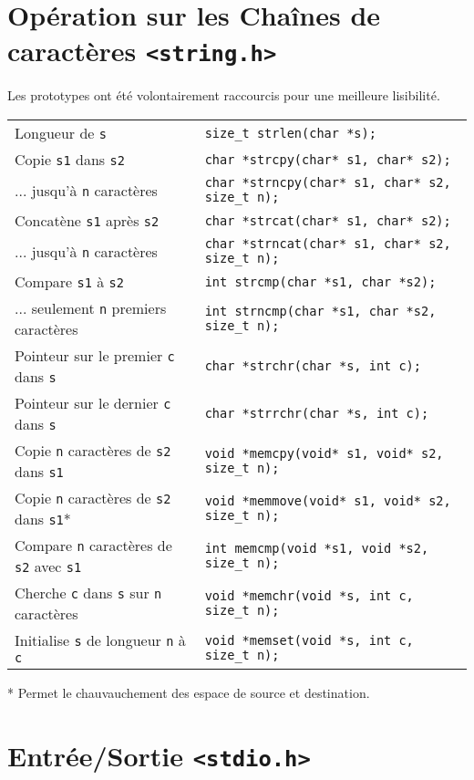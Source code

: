 \documentclass{article}
\newcommand{\cd}{\lstinline}
\begin{document}
\begin{multicols*}{3}
\section*{Opération sur les Chaînes de caractères \texttt{<string.h>}}
Les prototypes ont été volontairement raccourcis pour une meilleure lisibilité.

\begin{tabularx}{\linewidth}{Xl}
  Longueur de \texttt{s} & \cd{size_t strlen(char *s);} \\
  Copie \texttt{s1} dans \texttt{s2} & \cd{char *strcpy(char* s1, char* s2);} \\
   ... jusqu'à \texttt{n} caractères & \cd{char *strncpy(char* s1, char* s2, size_t n);} \\
  Concatène \texttt{s1} après \texttt{s2} & \cd{char *strcat(char* s1, char* s2);} \\
   ... jusqu'à \texttt{n} caractères & \cd{char *strncat(char* s1, char* s2, size_t n);} \\
  Compare \texttt{s1} à \texttt{s2} & \cd{int strcmp(char *s1, char *s2);} \\
   ... seulement \texttt{n} premiers caractères & \cd{int strncmp(char *s1, char *s2, size_t n);} \\
  Pointeur sur le premier \texttt{c} dans \texttt{s} & \cd{char *strchr(char *s, int c);} \\
  Pointeur sur le dernier \texttt{c} dans \texttt{s} & \cd{char *strrchr(char *s, int c);} \\
  \hline
  Copie \texttt{n} caractères de \texttt{s2} dans \texttt{s1} & \cd{void *memcpy(void* s1, void* s2, size_t n);} \\
  Copie \texttt{n} caractères de \texttt{s2} dans \texttt{s1}* & \cd{void *memmove(void* s1, void* s2, size_t n);} \\
  Compare \texttt{n} caractères de \texttt{s2} avec \texttt{s1} & \cd{int memcmp(void *s1, void *s2, size_t n);} \\
  Cherche \texttt{c} dans \texttt{s} sur \texttt{n} caractères & \cd{void *memchr(void *s, int c, size_t n);} \\
  Initialise \texttt{s} de longueur \texttt{n} à \texttt{c} & \cd{void *memset(void *s, int c, size_t n);} \\
\end{tabularx}

* Permet le chauvauchement des espace de source et destination.

\section*{Entrée/Sortie \texttt{<stdio.h>}}


\end{multicols*}
\end{document}
